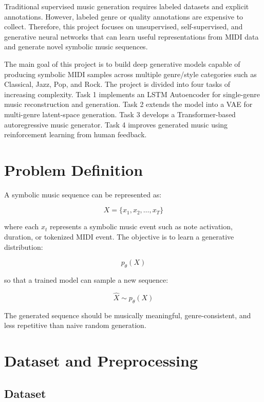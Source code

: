 \documentclass[conference]{IEEEtran}
\begin{document}
Traditional supervised music generation requires labeled datasets and explicit annotations. However, labeled genre or quality annotations are expensive to collect. Therefore, this project focuses on unsupervised, self-supervised, and generative neural networks that can learn useful representations from MIDI data and generate novel symbolic music sequences.

The main goal of this project is to build deep generative models capable of producing symbolic MIDI samples across multiple genre/style categories such as Classical, Jazz, Pop, and Rock. The project is divided into four tasks of increasing complexity. Task 1 implements an LSTM Autoencoder for single-genre music reconstruction and generation. Task 2 extends the model into a VAE for multi-genre latent-space generation. Task 3 develops a Transformer-based autoregressive music generator. Task 4 improves generated music using reinforcement learning from human feedback.

\section{Problem Definition}

A symbolic music sequence can be represented as:

\begin{equation}
X = \{x_1, x_2, \ldots, x_T\}
\end{equation}

where each $x_t$ represents a symbolic music event such as note activation, duration, or tokenized MIDI event. The objective is to learn a generative distribution:

\begin{equation}
p_{\theta}(X)
\end{equation}

so that a trained model can sample a new sequence:

\begin{equation}
\hat{X} \sim p_{\theta}(X)
\end{equation}

The generated sequence should be musically meaningful, genre-consistent, and less repetitive than naive random generation.

\section{Dataset and Preprocessing}

\subsection{Dataset}
\end{document}
